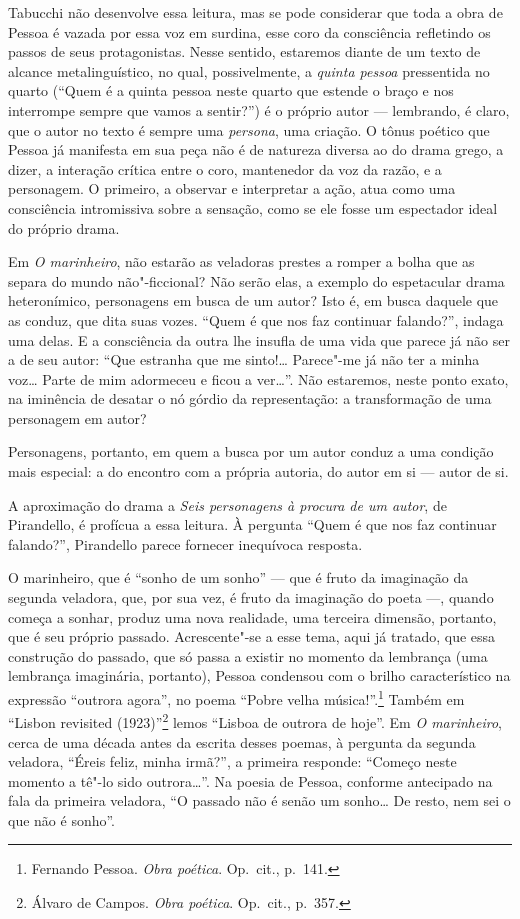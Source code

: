 Tabucchi não desenvolve essa leitura, mas se pode considerar que toda a
obra de Pessoa é vazada por essa voz em surdina, esse coro da
consciência refletindo os passos de seus protagonistas. Nesse sentido,
estaremos diante de um texto de alcance metalinguístico, no qual,
possivelmente, a \textit{quinta pessoa} pressentida no quarto (“Quem é
a quinta pessoa neste quarto que estende o braço e nos interrompe
sempre que vamos a sentir?”) é o próprio autor --- lembrando, é claro,
que o autor no texto é sempre uma
\textit{persona}, uma criação. O
tônus poético que Pessoa já manifesta em sua peça não é de natureza
diversa ao do drama grego, a dizer, a interação crítica entre o coro,
mantenedor da voz da razão, e a personagem. O primeiro, a observar e
interpretar a ação, atua como uma consciência intromissiva sobre a
sensação, como se ele fosse um espectador ideal do próprio drama. 

Em \textit{O marinheiro}, não estarão as veladoras prestes a romper a
bolha que as separa do mundo não"-ficcional? Não serão elas, a exemplo do
espetacular drama heteronímico, personagens em busca de um autor? Isto
é, em busca daquele que as conduz, que dita suas vozes. “Quem é que nos
faz continuar falando?”, indaga uma delas. E a consciência da outra lhe
insufla de uma vida que parece já não ser a de seu autor: “Que estranha
que me sinto!\ldots{} Parece"-me já não ter a minha voz\ldots{} Parte de mim
adormeceu e ficou a ver\ldots{}”. Não estaremos, neste ponto exato, na
iminência de desatar o nó górdio da representação: a transformação de
uma personagem em autor? 

Personagens, portanto, em quem a busca por um autor conduz a uma
condição mais especial: a do encontro com a própria autoria, do autor
em si --- autor de si.

A aproximação do drama a \textit{Seis personagens à procura de um
autor}, de Pirandello, é profícua a essa leitura. À pergunta “Quem é
que nos faz continuar falando?”, Pirandello parece fornecer
inequívoca resposta.

O marinheiro, que é “sonho de um sonho” --- que é
fruto da imaginação da segunda veladora, que, por sua vez, é fruto da
imaginação do poeta ---, quando começa a sonhar, produz uma nova
realidade, uma terceira dimensão, portanto, que é seu próprio passado.
Acrescente"-se a esse tema, aqui já tratado, que essa construção do passado, que só passa a existir no momento da
lembrança (uma lembrança imaginária, portanto), Pessoa condensou com o
brilho característico na expressão “outrora agora”, no poema “Pobre
velha música!”.\footnote{ Fernando Pessoa. \textit{Obra poética}. Op.~cit.,
p.~141.} Também em “Lisbon revisited (1923)”\footnote{ 
Álvaro de Campos. \textit{Obra poética}. Op.~cit., p.~357.} lemos “Lisboa de
outrora de hoje”. Em \textit{O marinheiro}, cerca de uma
década antes da escrita desses poemas, à pergunta da segunda veladora,
“Éreis feliz, minha irmã?”, a primeira responde: “Começo neste momento
a tê"-lo sido outrora\ldots{}”. Na poesia de Pessoa, conforme antecipado na
fala da primeira veladora, “O passado não é senão um sonho\ldots{} De resto,
nem sei o que não é sonho”.

